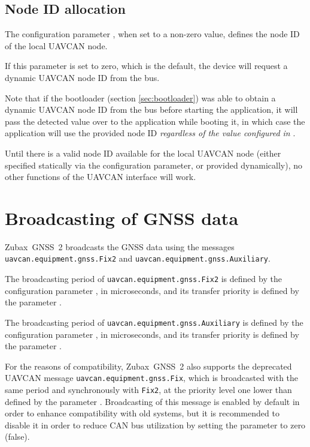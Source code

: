 \documentclass{zubaxdoc}
\begin{document}
\subsection{Node ID allocation}

The configuration parameter , when set to a non-zero value,
defines the node ID of the local UAVCAN node.

If this parameter is set to zero, which is the default, the device will request a dynamic UAVCAN node ID
from the bus.

Note that if the bootloader (section \ref{sec:bootloader}) was able to obtain a dynamic UAVCAN node ID
from the bus before starting the application,
it will pass the detected value over to the application while booting it,
in which case the application will use the provided node ID
\emph{regardless of the value configured in }.

Until there is a valid node ID available for the local UAVCAN node (either specified
statically via the configuration parameter, or provided dynamically),
no other functions of the UAVCAN interface will work.

\section{Broadcasting  of GNSS data}

Zubax~GNSS~2 broadcasts the GNSS data using the messages
\verb|uavcan.equipment.gnss.Fix2| and \verb|uavcan.equipment.gnss.Auxiliary|.

The broadcasting period of \verb|uavcan.equipment.gnss.Fix2| is defined by the configuration
parameter , in microseconds, and its transfer priority is defined by the
parameter .

The broadcasting period of \verb|uavcan.equipment.gnss.Auxiliary| is defined by the configuration
parameter , in microseconds, and its transfer priority is defined by the
parameter .

For the reasons of compatibility, Zubax~GNSS~2 also supports the deprecated UAVCAN message
\verb|uavcan.equipment.gnss.Fix|, which is broadcasted with the same period and
synchronously with \verb|Fix2|, at the priority level one lower than
defined by the parameter .
Broadcasting of this message is enabled by default in order to enhance compatibility with old systems,
but it is recommended to disable it in order to reduce CAN bus utilization by setting
the parameter  to zero (false).
\end{document}
